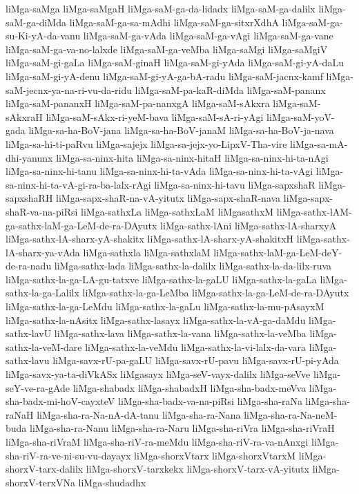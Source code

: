 {liMga-saMga
liMga-saMgaH
liMga-saM-ga-da-lidadx
liMga-saM-ga-dalilx
liMga-saM-ga-diMda
liMga-saM-ga-sa-mAdhi
liMga-saM-ga-sitxrXdhA
liMga-saM-ga-su-Ki-yA-da-vanu
liMga-saM-ga-vAda
liMga-saM-ga-vAgi
liMga-saM-ga-vane
liMga-saM-ga-va-no-lalxde
liMga-saM-ga-veMba
liMga-saMgi
liMga-saMgiV
liMga-saM-gi-gaLa
liMga-saM-ginaH
liMga-saM-gi-yAda
liMga-saM-gi-yA-daLu
liMga-saM-gi-yA-denu
liMga-saM-gi-yA-ga-bA-radu
liMga-saM-jacnx-kamf
liMga-saM-jecnx-ya-na-ri-vu-da-ridu
liMga-saM-pa-kaR-diMda
liMga-saM-pananx
liMga-saM-pananxH
liMga-saM-pa-nanxgA
liMga-saM-sAkxra
liMga-saM-sAkxraH
liMga-saM-sAkx-ri-yeM-bava
liMga-saM-sA-ri-yAgi
liMga-saM-yoV-gada
liMga-sa-ha-BoV-jana
liMga-sa-ha-BoV-janaM
liMga-sa-ha-BoV-ja-nava
liMga-sa-hi-ti-paRvu
liMga-sajejx
liMga-sa-jejx-yo-LipxV-Tha-vire
liMga-sa-mA-dhi-yanunx
liMga-sa-ninx-hita
liMga-sa-ninx-hitaH
liMga-sa-ninx-hi-ta-nAgi
liMga-sa-ninx-hi-tanu
liMga-sa-ninx-hi-ta-vAda
liMga-sa-ninx-hi-ta-vAgi
liMga-sa-ninx-hi-ta-vA-gi-ra-ba-lalx-rAgi
liMga-sa-ninx-hi-tavu
liMga-sapxshaR
liMga-sapxshaRH
liMga-sapx-shaR-na-vA-yitutx
liMga-sapx-shaR-nava
liMga-sapx-shaR-va-na-piRsi
liMga-sathxLa
liMga-sathxLaM
liMgasathxM
liMga-sathx-lAM-ga-sathx-laM-ga-LeM-de-ra-DAyutx
liMga-sathx-lAni
liMga-sathx-lA-sharxyA
liMga-sathx-lA-sharx-yA-shakitx
liMga-sathx-lA-sharx-yA-shakitxH
liMga-sathx-lA-sharx-ya-vAda
liMga-sathxla
liMga-sathxlaM
liMga-sathx-laM-ga-LeM-deY-de-ra-nadu
liMga-sathx-lada
liMga-sathx-la-dalilx
liMga-sathx-la-da-lilx-ruva
liMga-sathx-la-ga-LA-gu-tatxve
liMga-sathx-la-gaLU
liMga-sathx-la-gaLa
liMga-sathx-la-ga-Lalilx
liMga-sathx-la-ga-LeMba
liMga-sathx-la-ga-LeM-de-ra-DAyutx
liMga-sathx-la-ga-LeMdu
liMga-sathx-la-gaLu
liMga-sathx-la-mu-pAsayxM
liMga-sathx-la-nAsitx
liMga-sathx-lasayx
liMga-sathx-la-vA-ga-daMdu
liMga-sathx-lavU
liMga-sathx-lava
liMga-sathx-la-vana
liMga-sathx-la-veMba
liMga-sathx-la-veM-dare
liMga-sathx-la-veMdu
liMga-sathx-la-vi-lalx-da-vara
liMga-sathx-lavu
liMga-savx-rU-pa-gaLU
liMga-savx-rU-pavu
liMga-savx-rU-pi-yAda
liMga-savx-ya-ta-diVkASx
liMgasayx
liMga-seV-vayx-dalilx
liMga-seVve
liMga-seY-ve-ra-gAde
liMga-shabadx
liMga-shabadxH
liMga-sha-badx-meVva
liMga-sha-badx-mi-hoV-cayxteV
liMga-sha-badx-va-na-piRsi
liMga-sha-raNa
liMga-sha-raNaH
liMga-sha-ra-Na-nA-dA-tanu
liMga-sha-ra-Nana
liMga-sha-ra-Na-neM-buda
liMga-sha-ra-Nanu
liMga-sha-ra-Naru
liMga-sha-riVra
liMga-sha-riVraH
liMga-sha-riVraM
liMga-sha-riV-ra-meMdu
liMga-sha-riV-ra-va-nAnxgi
liMga-sha-riV-ra-ve-ni-su-vu-dayayx
liMga-shorxVtarx
liMga-shorxVtarxM
liMga-shorxV-tarx-dalilx
liMga-shorxV-tarxkekx
liMga-shorxV-tarx-vA-yitutx
liMga-shorxV-terxVNa
liMga-shudadhx
}
